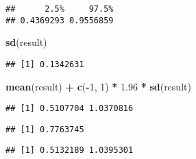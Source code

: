 \documentclass[]{book}
\newenvironment{Shaded}{\begin{snugshade}}{\end{snugshade}}
\newcommand{\DecValTok}[1]{\textcolor[rgb]{0.00,0.00,0.81}{#1}}
\newcommand{\FloatTok}[1]{\textcolor[rgb]{0.00,0.00,0.81}{#1}}
\newcommand{\KeywordTok}[1]{\textcolor[rgb]{0.13,0.29,0.53}{\textbf{#1}}}
\newcommand{\NormalTok}[1]{#1}
\newcommand{\OperatorTok}[1]{\textcolor[rgb]{0.81,0.36,0.00}{\textbf{#1}}}
\newcommand{\StringTok}[1]{\textcolor[rgb]{0.31,0.60,0.02}{#1}}
\begin{document}
\begin{verbatim}
##      2.5%     97.5% 
## 0.4369293 0.9556859
\end{verbatim}

\begin{Shaded}
\begin{Highlighting}[]
\KeywordTok{sd}\NormalTok{(result)}
\end{Highlighting}
\end{Shaded}

\begin{verbatim}
## [1] 0.1342631
\end{verbatim}

\begin{Shaded}
\begin{Highlighting}[]
\KeywordTok{mean}\NormalTok{(result) }\OperatorTok{+}\StringTok{ }\KeywordTok{c}\NormalTok{(}\OperatorTok{-}\DecValTok{1}\NormalTok{, }\DecValTok{1}\NormalTok{) }\OperatorTok{*}\StringTok{ }\FloatTok{1.96} \OperatorTok{*}\StringTok{ }\KeywordTok{sd}\NormalTok{(result)}
\end{Highlighting}
\end{Shaded}

\begin{verbatim}
## [1] 0.5107704 1.0370816
\end{verbatim}

\begin{Shaded}
\end{Shaded}

\begin{verbatim}
## [1] 0.7763745
\end{verbatim}

\begin{Shaded}
\end{Shaded}

\begin{verbatim}
## [1] 0.5132189 1.0395301
\end{verbatim}
\end{document}
